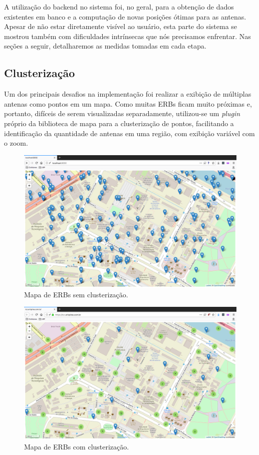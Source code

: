 \documentclass[]{politex}
\begin{document}
A utilização do backend no sistema foi, no geral, para a obtenção de dados
existentes em banco e a computação de novas posições ótimas para as antenas.
Apesar de não estar diretamente visível ao usuário, esta parte do sistema se
mostrou também com dificuldades intrínsecas que nós precisamos enfrentar. Nas
seções a seguir, detalharemos as medidas tomadas em cada etapa.

\subsection{Clusterização}

Um dos principais desafios na implementação foi realizar a exibição de múltiplas
antenas como pontos em um mapa. Como muitas ERBs ficam muito próximas e,
portanto, difíceis de serem visualizadas separadamente, utilizou-se um
\textit{plugin} próprio da biblioteca de mapa para a clusterização de pontos,
facilitando a identificação da quantidade de antenas em uma região, com exibição
variável com o zoom.

  \begin{figure}[H]
    \centering
    \includegraphics[width=6in]{imagens/mapa_sem_clusters}
    \caption{Mapa de ERBs sem clusterização.}
    \label{fig:mapa_sem_clusters}
  \end{figure}

  \begin{figure}[H]
    \centering
    \includegraphics[width=6in]{imagens/mapa_com_clusters}
    \caption{Mapa de ERBs com clusterização.}
    \label{fig:mapa_com_clusters}
  \end{figure}
\end{document}
